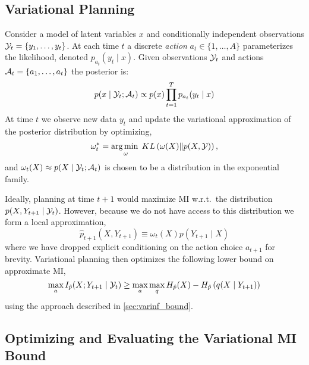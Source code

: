 \documentclass{article}
\begin{document}
\subsection{Variational Planning}

Consider a model of latent variables $x$ and conditionally independent
observations $\mathcal{Y}_t = \{y_1,\ldots,y_t\}$.  At each time $t$ a
discrete \emph{action} $a_t \in \{1,\ldots,A\}$ parameterizes the
likelihood, denoted \mbox{$p_{a_t}(y_t \mid x)$}.  Given observations
$\mathcal{Y}_t$ and actions $\mathcal{A}_t = \{a_1,\ldots,a_t\}$ the
posterior is:
\begin{equation}\label{eq:joint}
  p(x\mid \mathcal{Y}_t; \mathcal{A}_t) \propto p(x) \prod_{t=1}^T p_{a_t}(y_t \mid x)
\end{equation}
At time $t$ we observe new data $y_t$ and update the variational
approximation of the posterior distribution by optimizing,
\begin{equation}\label{eq:local_approx}
  \omega_t^* = \operatorname*{arg\,min\;}_{\omega} KL\left( \omega(X) \| p(X, \mathcal{Y}) \right),
\end{equation}
and $\omega_t(X) \approx p(X\mid \mathcal{Y}_t; \mathcal{A}_t)$ is chosen to be a
distribution in the exponential family.  

Ideally, planning at time $t+1$ would maximize MI w.r.t.~the
distribution $p(X,Y_{t+1} \mid \mathcal{Y}_t)$.  However, because we do not
have access to this distribution we form a local approximation,
\[
  \hat{p}_{t+1}(X,Y_{t+1}) \equiv \omega_t(X) p(Y_{t+1} \mid X)
\]
where we have dropped explicit conditioning on the action choice
$a_{t+1}$ for brevity.  Variational planning then optimizes the
following lower bound on approximate MI,
\begin{equation}\label{eq:varmi_approx}
  \max_a I_{\hat{p}}(X;Y_{t+1} \mid \mathcal{Y}_t) \geq \max_a \max_q
  H_{\hat{p}}(X) - H_{\hat{p}}\left( q(X \mid Y_{t+1}) \right)
\end{equation}
using the approach described in \SEC\ref{sec:varinf_bound}.


\subsection{Optimizing and Evaluating the Variational MI Bound}
\end{document}
